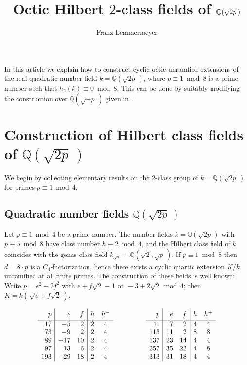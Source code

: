 \documentclass{amsart}
\title{Octic Hilbert $2$-class fields of $\Q(\sqrt{2p}\,)$}
\author{Franz Lemmermeyer}
\newcommand{\rsp}{\raisebox{0em}[2.7ex][1.3ex]{\rule{0em}{2ex} }}
\newcommand{\Q}{{\mathbb Q}}
\newcommand{\gen}{{\operatorname{gen}}}
\begin{document}
\maketitle

In this article we explain how to construct cyclic octic unramfied
extensions of the real quadratic number field $k = \Q(\sqrt{2p}\,)$, 
where $p \equiv 1 \bmod 8$ is
a prime number such that $h_2(k) \equiv 0 \bmod 8$. This can be done
by suitably modifying the construction over $\Q(\sqrt{-p}\,)$ given in
\cite{LemD}.


\section{Construction of Hilbert class fields of $\Q(\sqrt{2p}\,)$}\label{HC2}

We begin by collecting elementary results on the $2$-class group  of
$k = \Q(\sqrt{2p}\,)$ for primes $p \equiv 1 \bmod 4$.

\subsection*{Quadratic number fields $\Q(\sqrt{2p}\,)$}


Let $p \equiv 1 \bmod 4$ be a prime number. The number fields
$k = \Q(\sqrt{2p}\,)$ with $p \equiv 5 \bmod 8$ have class number
$h \equiv 2 \bmod 4$, and the Hilbert class field of $k$ coincides with
the genus class field $k_\gen = \Q(\sqrt{2}, \sqrt{p}\,)$.
If $p \equiv 1 \bmod 8$ then $d = 8 \cdot p$ is a $C_4$-factorization,
hence there exists a cyclic quartic extension $K/k$ unramified at all
finite primes. The construction of these fields is well known:
Write $p = e^2 - 2f^2$ with $e + f \sqrt{2} \equiv 1$ or
$\equiv 3 + 2\sqrt{2} \bmod 4$; then $K = k(\sqrt{e+f\sqrt{2}}\,)$.


\begin{table}[ht!]
  $$ \begin{array}{r|rr|cc}
    \rsp  p  & e & f & h & h^+  \\ \hline
     17 &  -5 &  2  & 2 &  4  \\
     73 &  -9 &  2  & 2 &  4  \\
     89 & -17 & 10  & 2 &  4  \\
     97 &  13 &  6  & 2 &  4  \\
    193 & -29 & 18  & 2 &  4     
  \end{array} \qquad \hskip 1cm
  \begin{array}{r|rr|cc}
    \rsp  p  & e & f & h & h^+  \\ \hline
    41 &  7 & 2  & 4 &  4  \\
    113 &  11 & 2  & 8 &  8  \\
    137 &  23 & 14  & 4 &  4  \\
    257 &  35 & 22  & 4 &  8  \\
    313 &  31 & 18  & 4 &  4  \\
  \end{array} $$
  \caption{Fields $\Q(\sqrt{2p}\,)$, where $p = e^2 - 2f^2$ with
    $f \equiv 2 \bmod 4$. Left: fields with $h \equiv 2 \bmod 4$;
    right: fields with $h$ divisible by $4$}
\end{table}
\end{document}
